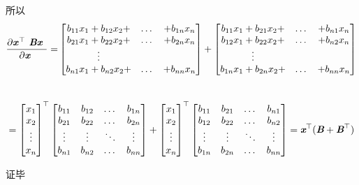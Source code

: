 \documentclass[UTF8]{ctexart}
\begin{document}
所以
$$
  \displaystyle{\frac{ \partial \mathbf{\textbf{\emph{x}}}^\top \textbf{ \emph {Bx} } }{ \partial \textbf{\emph {x} }}
    =}
  \begin{bmatrix}
    b_{11}x_{1}+ b_{12}x_{2}+ & \dots & +b_{1n}x_{n} \\
    b_{21}x_{1}+ b_{22}x_{2}+ & \dots & +b_{2n}x_{n} \\
    \vdots                                           \\
    b_{n1}x_{1}+ b_{n2}x_{2}+ & \dots & +b_{nn}x_{n}
  \end{bmatrix}
  +
  \begin{bmatrix}
    b_{11}x_{1}+ b_{21}x_{2}+ & \dots & +b_{n1}x_{n} \\
    b_{12}x_{1}+ b_{22}x_{2}+ & \dots & +b_{n2}x_{n} \\
    \vdots                                           \\
    b_{1n}x_{1}+ b_{2n}x_{2}+ & \dots & +b_{nn}x_{n}
  \end{bmatrix}
$$
\\
$$
  =
  \mathbf{\begin{bmatrix}
      x_{1}  \\
      x_{2}  \\
      \vdots \\
      x_{n}
    \end{bmatrix}}^\top
  \begin{bmatrix}
    b_{11} & b_{12} & \dots  & b_{1n} \\
    b_{21} & b_{22} & \dots  & b_{2n} \\
    \vdots & \vdots & \ddots & \vdots \\
    b_{n1} & b_{n2} & \dots  & b_{nn}
  \end{bmatrix}
  +
  \mathbf{\begin{bmatrix}
      x_{1}  \\
      x_{2}  \\
      \vdots \\
      x_{n}
    \end{bmatrix}}^\top
  \begin{bmatrix}
    b_{11} & b_{21} & \dots  & b_{n1} \\
    b_{12} & b_{22} & \dots  & b_{n2} \\
    \vdots & \vdots & \ddots & \vdots \\
    b_{1n} & b_{2n} & \dots  & b_{nn}
  \end{bmatrix}
  =\textbf{$\mathbf{\emph{x}}^\top (\emph {B}+\mathbf{\emph{B}}^\top)$}$$

证毕
\end{document}
